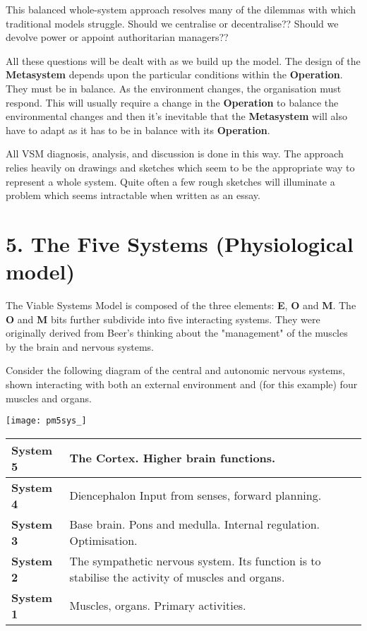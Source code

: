 This balanced whole-system approach resolves many of the dilemmas with which traditional models struggle. Should we centralise or decentralise?? Should we devolve power or appoint authoritarian managers??

All these questions will be dealt with as we build up the model. The design of the \textcolor{M}{\textbf{Metasystem}} depends upon the particular conditions within the \textcolor{O}{\textbf{Operation}}. They must be in balance. As the environment changes, the organisation must respond. This will usually require a change in the \textcolor{O}{\textbf{Operation}} to balance the environmental changes and then it's inevitable that the \textcolor{M}{\textbf{Metasystem}} will also have to adapt as it has to be in balance with its \textcolor{O}{\textbf{Operation}}.

All VSM diagnosis, analysis, and discussion is done in this way. The approach relies heavily on drawings and sketches which seem to be the appropriate way to represent a whole system. Quite often a few rough sketches will illuminate a problem which seems intractable when written as an essay.

\section*{5. The Five Systems (Physiological model)}
The Viable Systems Model is composed of the three elements: \textcolor{E}{\textbf{E}}, \textcolor{O}{\textbf{O}} and \textcolor{M}{\textbf{M}}. The \textcolor{O}{\textbf{O}} and \textcolor{M}{\textbf{M}} bits further subdivide into five interacting systems. They were originally derived from Beer's thinking about the "management" of the muscles by the brain and nervous systems.

Consider the following diagram of the central and autonomic nervous systems, shown interacting with both an external environment and (for this example) four muscles and organs.

\begin{center}
	\texttt{[image: pm5sys\_]}
\end{center}

{\renewcommand{\arraystretch}{1.5} %
\begin{tabular}{ | p{} | p{} | }
	\hline
	\textbf{System 5} & The Cortex. Higher brain functions. \\
	\hline
	\textbf{System 4} & Diencephalon Input from senses, forward planning. \\
	\hline
	\textbf{System 3} & Base brain. Pons and medulla. Internal regulation. \mbox{Optimisation}. \\
	\hline
	\textbf{System 2} & The sympathetic nervous system. Its function is to \mbox{stabilise} the activity of muscles and organs. \\
	\hline
	\textbf{System 1} & Muscles, organs. Primary activities. \\
	\hline
\end{tabular}
}

